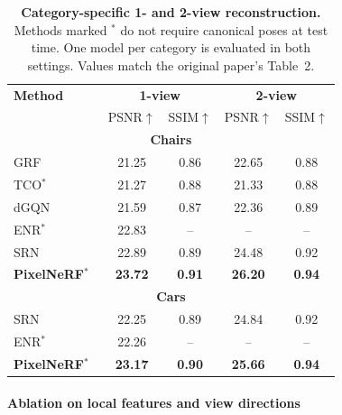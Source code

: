 \begin{enrichment}
\begin{enrichment}
     \begin{table}[H]
         \centering
         \small
         \setlength{\tabcolsep}{6pt}
         \begin{tabular}{|l|c|c|c|c|}
             \hline
             \textbf{Method} & \multicolumn{2}{c|}{\textbf{1-view}} & \multicolumn{2}{c|}{\textbf{2-view}} \\
             & PSNR$\uparrow$ & SSIM$\uparrow$ & PSNR$\uparrow$ & SSIM$\uparrow$ \\
             \hline
             \multicolumn{5}{|c|}{\textbf{Chairs}} \\
             \hline
             GRF~\cite{trevithick2021_grf} & 21.25 & 0.86 & 22.65 & 0.88 \\
             TCO$^\ast$~\cite{tatarchenko2015_tco} & 21.27 & 0.88 & 21.33 & 0.88 \\
             dGQN~\cite{eslami2018_dgqn} & 21.59 & 0.87 & 22.36 & 0.89 \\
             ENR$^\ast$~\cite{dupont2020_enr} & 22.83 & -- & -- & -- \\
             SRN~\cite{sitzmann2019_srn} & 22.89 & 0.89 & 24.48 & 0.92 \\
             \textbf{PixelNeRF}$^\ast$~\cite{yu2020_pixelnerf} & \textbf{23.72} & \textbf{0.91} & \textbf{26.20} & \textbf{0.94} \\
             \hline
             \multicolumn{5}{|c|}{\textbf{Cars}} \\
             \hline
             SRN~\cite{sitzmann2019_srn} & 22.25 & 0.89 & 24.84 & 0.92 \\
             ENR$^\ast$~\cite{dupont2020_enr} & 22.26 & -- & -- & -- \\
             \textbf{PixelNeRF}$^\ast$~\cite{yu2020_pixelnerf} & \textbf{23.17} & \textbf{0.90} & \textbf{25.66} & \textbf{0.94} \\
             \hline
         \end{tabular}
         \caption{\textbf{Category-specific 1- and 2-view reconstruction.} Methods marked $^\ast$ do not require canonical poses at test time. One model per category is evaluated in both settings. Values match the original paper’s Table~2.}
         \label{tab:chapter23_pixelnerf_catspecific}
     \end{table}
     
     \paragraph{Ablation on local features and view directions}
     \label{par:chapter23_pixelnerf_ablation_local_dirs}
     

\end{enrichment}
\end{enrichment}
